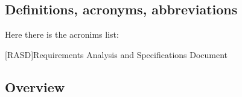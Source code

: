 \subsection{Definitions, acronyms, abbreviations} \label{subsec:def}

Here there is the acronims list:

\begin{acronym}[RASD] %

[RASD]{Requirements Analysis and Specifications Document}

\end{acronym}


\subsection{Overview} \label{subsec:overview}


